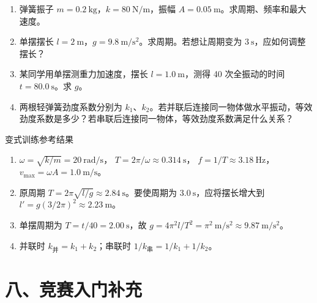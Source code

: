 \begin{enumerate}
  \item 弹簧振子 $m = 0.2\ \mathrm{kg}$，$k = 80\ \mathrm{N/m}$，振幅 $A = 0.05\ \mathrm{m}$。求周期、频率和最大速度。

  \item 单摆摆长 $l = 2\ \mathrm{m}$，$g = 9.8\ \mathrm{m/s^2}$。求周期。若想让周期变为 $3\ \mathrm{s}$，应如何调整摆长？
  \begin{center}
  
  \end{center}

  \item 某同学用单摆测重力加速度，摆长 $l = 1.0\ \mathrm{m}$，测得 40 次全振动的时间 $t = 80.0\ \mathrm{s}$。求 $g$。

  \item 两根轻弹簧劲度系数分别为 $k_1$、$k_2$。若并联后连接同一物体做水平振动，等效劲度系数是多少？若串联后连接同一物体，等效劲度系数满足什么关系？
\end{enumerate}

\begin{learningbox}{变式训练参考结果}
\begin{enumerate}[itemsep=0.45em,topsep=0.3em,parsep=0pt]
  \item $\omega=\sqrt{k/m}=20\ \mathrm{rad/s}$，
  $T=2\pi/\omega\approx0.314\ \mathrm s$，
  $f=1/T\approx3.18\ \mathrm{Hz}$，$v_{\max}=\omega A=1.0\ \mathrm{m/s}$。
  \item 原周期 $T=2\pi\sqrt{l/g}\approx2.84\ \mathrm s$。要使周期为
  $3.0\ \mathrm s$，应将摆长增大到
  $l'=g(3/2\pi)^2\approx2.23\ \mathrm m$。
  \item 单摆周期为 $T=t/40=2.00\ \mathrm s$，故
  $g=4\pi^2l/T^2=\pi^2\ \mathrm{m/s^2}\approx9.87\ \mathrm{m/s^2}$。
  \item 并联时 $k_{\text{并}}=k_1+k_2$；串联时
  $\displaystyle 1/k_{\text{串}}=1/k_1+1/k_2$。
\end{enumerate}
\end{learningbox}

\section*{八、竞赛入门补充}

